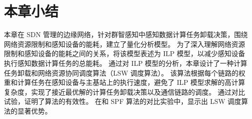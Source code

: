 \section{本章小结}

本章在 SDN 管理的边缘网络，针对群智感知中感知数据计算任务卸载决策，围绕网络资源限制和感知设备的能耗，建立了量化分析模型。
为了深入理解网络资源限制和感知设备的能耗之间的关系，将该模型表述为 ILP 模型，以减少感知设备执行感知数据计算任务的总能耗。
通过对 ILP 模型的分析，本章设计了一种计算任务卸载和网络资源协同调度算法（LSW 调度算法）。
该算法根据每个链路的权重和计算任务在感知设备与主基站上的执行速度，避免了 ILP 模型求解的高计算复杂度，实现了接近最优解的计算任务卸载决策以及通信链路的调度。
通过对比试验，证明了算法的有效性。
在和 SPF 算法的对比实验中，显示出 LSW 调度算法的显著优势。



